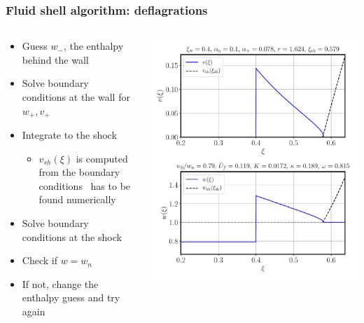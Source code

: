 \begin{frame}
    \frametitle{Fluid shell algorithm: deflagrations}
    \begin{columns}
    \begin{column}{0.6\textwidth}
        \begin{itemize}
                \item Guess $w_-$, the enthalpy behind the wall
                \item Solve boundary conditions at the wall for $w_+, v_+$
                \item Integrate to the shock
                \begin{itemize}
                    \item $v_{sh}(\xi)$ is computed from the boundary conditions \textrightarrow \ has to be found numerically
                \end{itemize}
                \item Solve boundary conditions at the shock
                \item Check if $w=w_n$
                \item If not, change the enthalpy guess and try again
        \end{itemize}
    \end{column}
    \begin{column}{0.4\textwidth}
        \includegraphics[width=\textwidth]{../fig/lecture_notes/shell_plot_vw_04_alphan_01_review}
    \end{column}
    \end{columns}
\end{frame}

